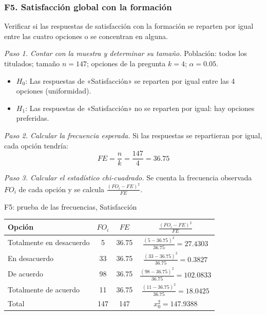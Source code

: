 \subsubsection*{F5. Satisfacción global con la formación}

Verificar si las respuestas de satisfacción con la formación se reparten por igual entre las cuatro opciones o se concentran en alguna.

\textit{Paso 1. Contar con la muestra y determinar su tamaño.} Población: todos los titulados; tamaño $n = 147$; opciones de la pregunta $k = 4$; $\alpha = 0.05$.

\begin{itemize}[nosep]
  \item $H_0$: Las respuestas de «Satisfacción» se reparten por igual entre las 4 opciones (uniformidad).
  \item $H_1$: Las respuestas de «Satisfacción» no se reparten por igual: hay opciones preferidas.
\end{itemize}

\textit{Paso 2. Calcular la frecuencia esperada.} Si las respuestas se repartieran por igual, cada opción tendría:
\[
FE = \frac{n}{k} = \frac{147}{4} = 36.75
\]

\textit{Paso 3. Calcular el estadístico chi-cuadrado.} Se cuenta la frecuencia observada $FO_i$ de cada opción y se calcula $\frac{(FO_i - FE)^2}{FE}$.

\begin{mitabla}{F5: prueba de las frecuencias, Satisfacción}
\begin{tabular}{L{6cm}ccc}
\toprule
Opción & $FO_i$ & $FE$ & $\frac{(FO_i-FE)^2}{FE}$ \\
\midrule
Totalmente en desacuerdo & 5 & 36.75 & $\frac{(5-36.75)^2}{36.75} = 27.4303$ \\[3pt]
En desacuerdo & 33 & 36.75 & $\frac{(33-36.75)^2}{36.75} = 0.3827$ \\[3pt]
De acuerdo & 98 & 36.75 & $\frac{(98-36.75)^2}{36.75} = 102.0833$ \\[3pt]
Totalmente de acuerdo & 11 & 36.75 & $\frac{(11-36.75)^2}{36.75} = 18.0425$ \\[3pt]
\midrule
Total & 147 & 147 & $x_0^2 = 147.9388$ \\
\bottomrule
\end{tabular}
\end{mitabla}

